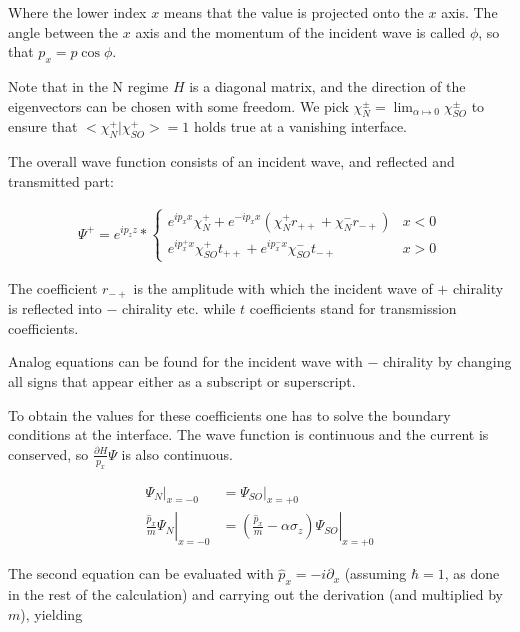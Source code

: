 \documentclass[11pt]{article}
\begin{document}
Where the lower index $x$ means that the value is projected onto the
$x$ axis. The angle between the $x$ axis and the momentum of the
incident wave is called $\phi$, so that $p_x = p \cos \phi$.

Note that in the N regime $H$ is a diagonal matrix, and the direction
of the eigenvectors can be chosen with some freedom. We pick
$\chi_N^{\pm} = \lim_{\alpha \mapsto 0} \chi_{SO}^{\pm}$ to ensure that
$<\chi_N^+|\chi_{SO}^+> = 1$ holds true at a vanishing interface.


The overall wave function consists of an incident wave, 
and reflected and transmitted part:

\begin{align}
    \Psi^+ = e^{i p_z z} * \left\{
        \begin{array}{ll}
            e^{i p_x x} \chi_N^+ + e^{- i p_x x} (\chi_N^+ r_{++} +
                    \chi_N^- r_{-+})    & x < 0\\
            e^{i p_x^+ x} \chi_{SO}^+ t_{++} + e^{i p_x^- x}
            \chi_{SO}^- t_{-+}          & x > 0
        \end{array} \right.
\end{align}

The coefficient $r_{-+}$ is the amplitude with which the incident wave
of $+$ chirality is reflected into $-$ chirality etc. while $t$
coefficients stand for transmission coefficients.

Analog equations can be found for the incident wave with $-$ chirality
by changing all signs that appear either as a subscript or
superscript.

To obtain the values for these coefficients one has to solve the
boundary conditions at the interface. The wave function is continuous
and the current is conserved, so $\frac{\partial H}{p_x} \Psi$ is also
continuous.

\begin{align}
    \Psi_N|_{x = -0}    &= \Psi_{SO}|_{x = +0} \label{eq:continuous}\\
    \left.\frac{\hat p_x}{m} \Psi_N\right|_{x = -0}
                        &= \left. \left(\frac{\hat p_x}{m} -\alpha \sigma_z\right)
                                \Psi_{SO}\right|_{x = +0}
\end{align}

The second equation can be evaluated with $\hat p_x = -i \partial_x$
(assuming $\hbar = 1$, as done in the rest of the calculation) and
carrying out the derivation (and multiplied by $m$), yielding
\end{document}
